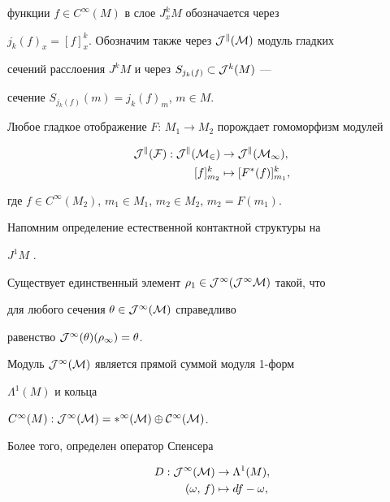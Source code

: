 функции $f\in C^\infty (M)$ в слое $J_x^kM$ обозначается через 


$j_k(f)_x=[f]_x^k$. Обозначим также через $\cal J^k(M)$ модуль гладких 


сечений расслоения $J^kM $ и через $S_{j_k(f)}\subset {\cal J}^k(M)$ ---


сечение $S_{j_k(f)}(m)=j_k(f)_m$, $m\in M$.





Любое гладкое отображение $F:\,M_1\to M_2$ порождает гомоморфизм модулей


\begin{align*}


\cal J^k(F): \cal J^k(M_2) & \to \cal J^k(M_1), \\ 


[f]_{m_2}^k & \mapsto [F^{*}(f)]_{m_1}^k,


\end{align*}


где $f\in C^\infty (M_2)$, $m_1\in M_1$, $m_2\in M_2$, $m_2=F(m_1)$.





Напомним определение естественной контактной структуры на


$J^1M$ \cite{lychagin1}.





\begin{prop}


Существует единственный элемент $\rho_1\in \cal J^1(J^1M)$ такой, что


для любого сечения $\theta \in \cal J^1(M)$ справедливо


равенство $\cal J^1(\theta )(\rho_1)=\theta$.


\end{prop}





Модуль $\cal J^1(M)$ является прямой суммой модуля 1-форм


$\Lambda^1(M)$ и кольца


$C^\infty (M):\cal J^1(M)=\Lambda^1(M)\oplus C^\infty (M)$.


Более того, определен оператор Спенсера


\begin{align*}


D: \cal J^1(M) & \to \Lambda^1(M), \\ 


(\omega ,\,f) & \mapsto df-\omega ,


\end{align*}


